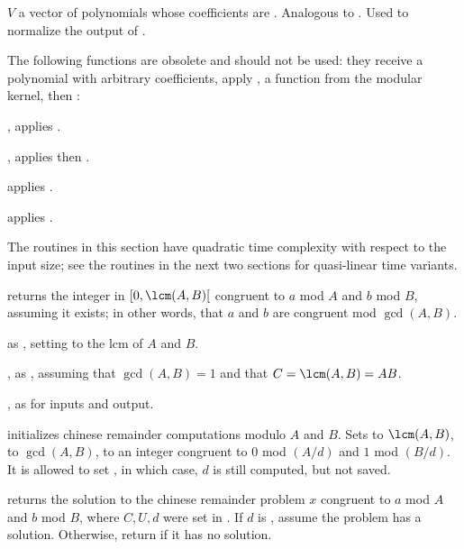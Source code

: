  $V$ a vector of polynomials whose
coefficients are . Analogous to .
Used to normalize the output of .

The following functions are obsolete and should not be used: they receive a
polynomial with arbitrary coefficients, apply , a function
from the modular kernel, then :

, applies .

, applies  then
.

 applies .

 applies .

The routines in this section have quadratic time complexity with respect to
the input size; see the routines in the next two sections for quasi-linear
time variants.

 returns the integer
in $[0, \lcm(A,B)[$ congruent to $a$ mod $A$ and $b$ mod $B$, assuming it
exists; in other words, that $a$ and $b$ are congruent mod $\gcd(A,B)$.

 as
, setting  to the lcm of $A$ and $B$.

, as
, assuming that $\gcd(A,B) = 1$ and that $C = \lcm(A,B) = AB$.

, as
 for  inputs and output.

initializes chinese remainder computations modulo $A$ and $B$. Sets
 to $\lcm(A,B)$,  to $\gcd(A,B)$,
 to an integer congruent to $0$ mod $(A/d)$ and $1$ mod $(B/d)$.
It is allowed to set , in which case, $d$ is still
computed, but not saved.

 returns
the solution to the chinese remainder problem $x$ congruent
to $a$ mod $A$ and $b$ mod $B$, where $C, U, d$ were set in
. If $d$ is , assume the problem has a
solution. Otherwise, return  if it has no solution.


